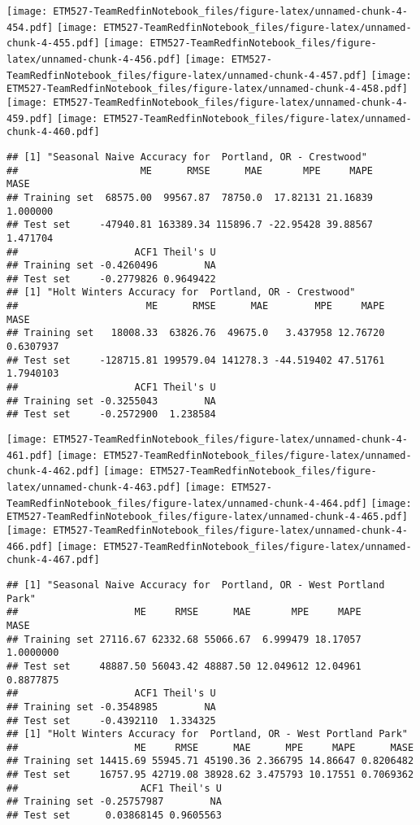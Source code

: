 \documentclass[]{article}
\begin{document}
\texttt{[image: ETM527-TeamRedfinNotebook\_files/figure-latex/unnamed-chunk-4-454.pdf]}
\texttt{[image: ETM527-TeamRedfinNotebook\_files/figure-latex/unnamed-chunk-4-455.pdf]}
\texttt{[image: ETM527-TeamRedfinNotebook\_files/figure-latex/unnamed-chunk-4-456.pdf]}
\texttt{[image: ETM527-TeamRedfinNotebook\_files/figure-latex/unnamed-chunk-4-457.pdf]}
\texttt{[image: ETM527-TeamRedfinNotebook\_files/figure-latex/unnamed-chunk-4-458.pdf]}
\texttt{[image: ETM527-TeamRedfinNotebook\_files/figure-latex/unnamed-chunk-4-459.pdf]}
\texttt{[image: ETM527-TeamRedfinNotebook\_files/figure-latex/unnamed-chunk-4-460.pdf]}

\begin{verbatim}
## [1] "Seasonal Naive Accuracy for  Portland, OR - Crestwood"
##                     ME      RMSE      MAE       MPE     MAPE     MASE
## Training set  68575.00  99567.87  78750.0  17.82131 21.16839 1.000000
## Test set     -47940.81 163389.34 115896.7 -22.95428 39.88567 1.471704
##                    ACF1 Theil's U
## Training set -0.4260496        NA
## Test set     -0.2779826 0.9649422
## [1] "Holt Winters Accuracy for  Portland, OR - Crestwood"
##                      ME      RMSE      MAE        MPE     MAPE      MASE
## Training set   18008.33  63826.76  49675.0   3.437958 12.76720 0.6307937
## Test set     -128715.81 199579.04 141278.3 -44.519402 47.51761 1.7940103
##                    ACF1 Theil's U
## Training set -0.3255043        NA
## Test set     -0.2572900  1.238584
\end{verbatim}

\texttt{[image: ETM527-TeamRedfinNotebook\_files/figure-latex/unnamed-chunk-4-461.pdf]}
\texttt{[image: ETM527-TeamRedfinNotebook\_files/figure-latex/unnamed-chunk-4-462.pdf]}
\texttt{[image: ETM527-TeamRedfinNotebook\_files/figure-latex/unnamed-chunk-4-463.pdf]}
\texttt{[image: ETM527-TeamRedfinNotebook\_files/figure-latex/unnamed-chunk-4-464.pdf]}
\texttt{[image: ETM527-TeamRedfinNotebook\_files/figure-latex/unnamed-chunk-4-465.pdf]}
\texttt{[image: ETM527-TeamRedfinNotebook\_files/figure-latex/unnamed-chunk-4-466.pdf]}
\texttt{[image: ETM527-TeamRedfinNotebook\_files/figure-latex/unnamed-chunk-4-467.pdf]}

\begin{verbatim}
## [1] "Seasonal Naive Accuracy for  Portland, OR - West Portland Park"
##                    ME     RMSE      MAE       MPE     MAPE      MASE
## Training set 27116.67 62332.68 55066.67  6.999479 18.17057 1.0000000
## Test set     48887.50 56043.42 48887.50 12.049612 12.04961 0.8877875
##                    ACF1 Theil's U
## Training set -0.3548985        NA
## Test set     -0.4392110  1.334325
## [1] "Holt Winters Accuracy for  Portland, OR - West Portland Park"
##                    ME     RMSE      MAE      MPE     MAPE      MASE
## Training set 14415.69 55945.71 45190.36 2.366795 14.86647 0.8206482
## Test set     16757.95 42719.08 38928.62 3.475793 10.17551 0.7069362
##                     ACF1 Theil's U
## Training set -0.25757987        NA
## Test set      0.03868145 0.9605563
\end{verbatim}
\end{document}
